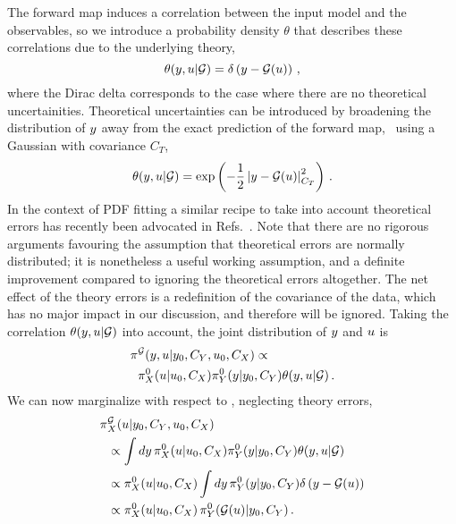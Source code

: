 The forward map induces a correlation between the input model and the
observables, so we introduce a probability density $\theta$ that describes these
correlations due to the underlying theory,  
\begin{equation}
  \label{eq:ThetaCorr}
  \theta(y,u|\mathcal{G}) = \delta\left(y - \mathcal{G}(u)\right)\, ,
\end{equation}
where the Dirac delta corresponds to the case where there are no theoretical
uncertainities. Theoretical uncertainties can be introduced by broadening the
distribution of $y$ away from the exact prediction of the forward map, \eg\
using a Gaussian with covariance $C_T$,
\begin{equation}
  \label{eq:TheoryErrors}
  \theta(y,u|\mathcal{G}) = \exp\left(
    -\frac12 
    \left| y - \mathcal{G}(u)
    \right|_{C_T}^2\right)\, .
\end{equation}
In the context of PDF fitting a similar recipe to take into account theoretical
errors has recently been advocated in
Refs.~\cite{NNPDF:2019vjt,AbdulKhalek:2019ihb}. Note that there are no rigorous
arguments favouring the assumption that theoretical errors are normally
distributed; it is nonetheless a useful working assumption, and a definite
improvement compared to ignoring the theoretical errors altogether. The net
effect of the theory errors is a redefinition of the covariance of the data,
which has no major impact in our discussion, and therefore will be ignored.
Taking the correlation $\theta(y,u|\mathcal{G})$ into account, the
joint distribution of $y$ and $u$ is
\begin{align}
  \label{eq:JointYAndU}
  \pi&^{\mathcal{G}}(y,u|y_0,C_{Y},u_0,C_X)
  \propto \nonumber \\ 
  &\pi_{X}^0(u|u_0, C_X) 
  \pi_{Y}^0(y|y_0,C_{Y}) 
  \theta(y,u|\mathcal{G})\, .
\end{align}
We can now marginalize with respect to \obs, neglecting theory errors, 
\begin{align}
  \label{eq:MarginOne}
  \pi&^{\mathcal{G}}_{X}(u|y_0,C_{Y},u_0,C_X) \nonumber \\
  &\propto \int dy\, 
    \pi_{X}^0(u|u_0,C_X) 
    \pi_{Y}^0(y|y_0,C_{Y}) 
    \theta(y,u|\mathcal{G}) \nonumber \\ 
  & \propto \pi_{X}^0(u|u_0,C_X)  
    \int dy\, 
    \pi_{Y}^0(y|y_0,C_{Y}) 
    \delta\left(y-\mathcal{G}(u)\right) \nonumber \\
  & \propto 
    \pi_{X}^0(u|u_0,C_X) \,
    \pi_{Y}^0(\mathcal{G}(u)|y_0,C_{Y})\, .
\end{align}
